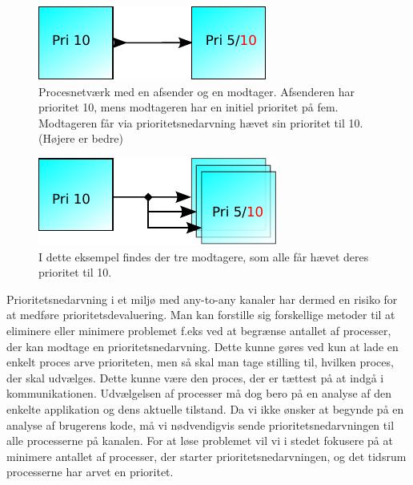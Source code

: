 \begin{figure}
 \begin{center}
  \includegraphics[scale=1.00]{images/one-to-one-inheritance}
\caption{Procesnetværk med en afsender og en modtager. Afsenderen har prioritet 10, mens modtageren har en initiel prioritet på fem. Modtageren  får via prioritetsnedarvning hævet sin prioritet til 10. (Højere er bedre)}
  \label{fig:one-to-one-inheritance}
  \end{center}
\end{figure}

\begin{figure}
 \begin{center}
  \includegraphics[scale=1.00]{images/any-to-any-inheritance}
  \caption{I dette eksempel findes der tre modtagere, som alle får hævet deres prioritet til 10.}
  \label{fig:any-to-any-inheritance}
  \end{center}
\end{figure}

 Prioritetsnedarvning i et miljø med any-to-any kanaler har dermed en risiko for at medføre prioritetsdevaluering. Man kan forstille sig forskellige metoder til at eliminere eller minimere problemet f.eks ved at begrænse antallet af processer, der kan modtage en prioritetsnedarvning. Dette kunne gøres ved kun at lade en enkelt proces arve prioriteten,  men så skal man tage stilling til, hvilken proces, der skal udvælges. Dette kunne være den proces, der er tættest på at indgå i kommunikationen.  Udvælgelsen af processer må dog bero på en analyse af den enkelte applikation og dens aktuelle tilstand. Da vi ikke ønsker at begynde på en analyse af brugerens kode, må vi nødvendigvis sende prioritetsnedarvningen til alle processerne på kanalen. For at løse problemet vil vi i stedet fokusere på at minimere antallet af processer, der starter prioritetsnedarvningen, og det tidsrum processerne har arvet en prioritet.

